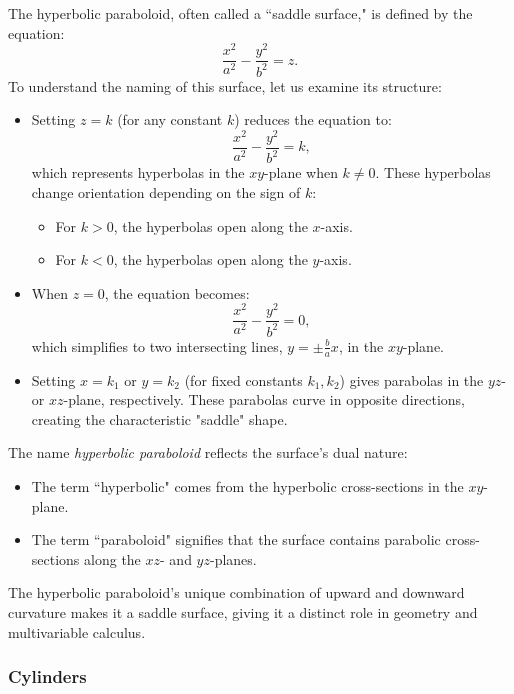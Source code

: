 \noindent The hyperbolic paraboloid, often called a ``saddle surface," is defined by the equation:
\[
\frac{x^2}{a^2} - \frac{y^2}{b^2} = z.
\]
\noindent To understand the naming of this surface, let us examine its structure:
\begin{itemize}
    \item Setting \( z = k \) (for any constant \( k \)) reduces the equation to:
    \[
    \frac{x^2}{a^2} - \frac{y^2}{b^2} = k,
    \]
    which represents hyperbolas in the \( xy \)-plane when \( k \neq 0 \). These hyperbolas change orientation depending on the sign of \( k \): 
    \begin{itemize}
        \item For \( k > 0 \), the hyperbolas open along the \( x \)-axis.
        \item For \( k < 0 \), the hyperbolas open along the \( y \)-axis.
    \end{itemize}
    \item When \( z = 0 \), the equation becomes:
    \[
    \frac{x^2}{a^2} - \frac{y^2}{b^2} = 0,
    \]
    which simplifies to two intersecting lines, \( y = \pm \frac{b}{a}x \), in the \( xy \)-plane.
    \item Setting \( x = k_1 \) or \( y = k_2 \) (for fixed constants \( k_1, k_2 \)) gives parabolas in the \( yz \)- or \( xz \)-plane, respectively. These parabolas curve in opposite directions, creating the characteristic "saddle" shape.
\end{itemize}

\noindent The name \textit{hyperbolic paraboloid} reflects the surface's dual nature:
\begin{itemize}
    \item The term ``hyperbolic" comes from the hyperbolic cross-sections in the \( xy \)-plane.
    \item The term ``paraboloid" signifies that the surface contains parabolic cross-sections along the \( xz \)- and \( yz \)-planes.
\end{itemize}

\noindent The hyperbolic paraboloid's unique combination of upward and downward curvature makes it a saddle surface, giving it a distinct role in geometry and multivariable calculus.


\subsubsection*{Cylinders}

